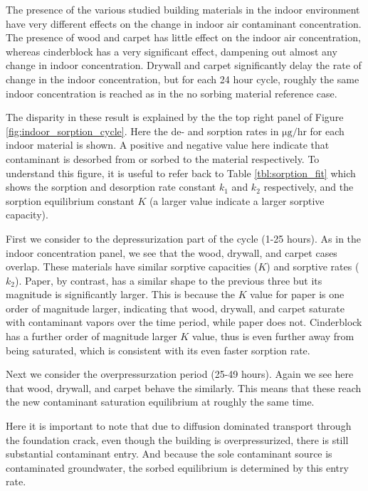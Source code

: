 The presence of the various studied building materials in the indoor environment have very different effects on the change in indoor air contaminant concentration.
The presence of wood and carpet has little effect on the indoor air concentration, whereas cinderblock has a very significant effect, dampening out almost any change in indoor concentration.
Drywall and carpet significantly delay the rate of change in the indoor concentration, but for each 24 hour cycle, roughly the same indoor concentration is reached as in the no sorbing material reference case.\par

The disparity in these result is explained by the the top right panel of Figure \ref{fig:indoor_sorption_cycle}.
Here the de- and sorption rates in $\mathrm{\mu g/hr}$ for each indoor material is shown.
A positive and negative value here indicate that contaminant is desorbed from or sorbed to the material respectively.
To understand this figure, it is useful to refer back to Table \ref{tbl:sorption_fit} which shows the sorption and desorption rate constant $k_1$ and $k_2$ respectively, and the sorption equilibrium constant $K$ (a larger value indicate a larger sorptive capacity).\par

First we consider to the depressurization part of the cycle (1-25 hours).
As in the indoor concentration panel, we see that the wood, drywall, and carpet cases overlap.
These materials have similar sorptive capacities ($K$) and sorptive rates ($k_2$).
Paper, by contrast, has a similar shape to the previous three but its magnitude is significantly larger.
This is because the $K$ value for paper is one order of magnitude larger, indicating that wood, drywall, and carpet saturate with contaminant vapors over the time period, while paper does not.
Cinderblock has a further order of magnitude larger $K$ value, thus is even further away from being saturated, which is consistent with its even faster sorption rate.\par

Next we consider the overpressurzation period (25-49 hours).
Again we see here that wood, drywall, and carpet behave the similarly.
This means that these reach the new contaminant saturation equilibrium at roughly the same time.\par

Here it is important to note that due to diffusion dominated transport through the foundation crack, even though the building is overpressurized, there is still substantial contaminant entry.
And because the sole contaminant source is contaminated groundwater, the sorbed equilibrium is determined by this entry rate.\par

